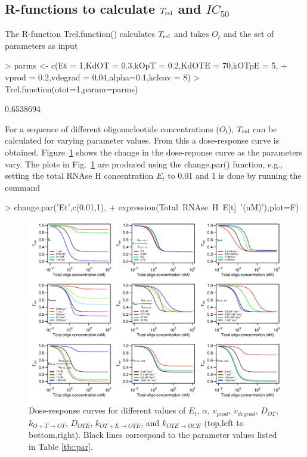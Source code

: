 \documentclass[a4paper,11pt]{article}
\newcommand{\ko}{k_{O+T \to OT}}
\newcommand{\kt}{k_{OT+E \to OTE}}
\newcommand{\kE}{k_{OTE \to OCE}}
\newcommand{\vp}{v_{prod}}
\newcommand{\vd}{v_{degrad}}
\newcommand{\Trel}{T_{\rm{rel}}}
\begin{document}
\subsection{R-functions to calculate $\Trel$ and $IC_{50}$}
The R-function Trel.function() calculates $\Trel$ and takes $O_t$ and the set of parameters as input
\begin{Schunk}
\begin{Sinput}
> parms <- c(Et = 1,KdOT = 0.3,kOpT = 0.2,KdOTE = 70,kOTpE = 5,	
+            vprod = 0.2,vdegrad = 0.04,alpha=0.1,kcleav = 8)
> Trel.function(otot=1,param=parms)
\end{Sinput}
\begin{Soutput}
[1] 0.6538694
\end{Soutput}
\end{Schunk}
For a sequence of different oligonucleotide concentrations ($O_t$), $\Trel$ can be calculated for varying parameter values. From this a dose-response curve is obtained.  Figure~\ref{fig::Etot} shows the change in the dose-reponse curve as the parameters vary. The plots in Fig.~\ref{fig::Etot} are produced using the change.par() function, e.g., setting the total RNAse H concentration $E_{t}$ to 0.01 and 1 is done by running the command
\begin{Schunk}
\begin{Sinput}
> change.par('Et',c(0.01,1),
+            expression(Total~RNAse~H~E[t]~'(nM)'),plot=F)
\end{Sinput}
\end{Schunk}
\begin{figure}[!t]
\includegraphics[width=\textwidth]{SuppFile1-S1.pdf}
\caption{Dose-response curves for different values of $E_{t}$, $\alpha$, $\vp$, $\vd$, $D_{OT}$, $\ko$, $D_{OTE}$, $\kt$, and $\kE$ (top,left to bottom,right). Black lines correspond to the parameter values listed in Table \ref{tb::par}.}\label{fig::Etot}
\end{figure}
\end{document}
